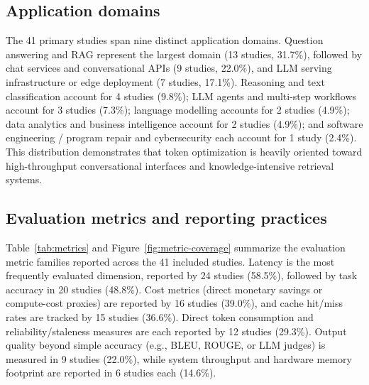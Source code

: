 \IfFileExists{jair.cls}{\documentclass{jair}}{\documentclass[manuscript,nonacm,screen]{acmart}}
\begin{document}
\subsection{Application domains}

The 41 primary studies span nine distinct application domains. Question answering and RAG represent the largest domain (13 studies, 31.7\%), followed by chat services and conversational APIs (9 studies, 22.0\%), and LLM serving infrastructure or edge deployment (7 studies, 17.1\%). Reasoning and text classification account for 4 studies (9.8\%); LLM agents and multi-step workflows account for 3 studies (7.3\%); language modelling accounts for 2 studies (4.9\%); data analytics and business intelligence account for 2 studies (4.9\%); and software engineering / program repair and cybersecurity each account for 1 study (2.4\%). This distribution demonstrates that token optimization is heavily oriented toward high-throughput conversational interfaces and knowledge-intensive retrieval systems.

\subsection{Evaluation metrics and reporting practices}

Table~\ref{tab:metrics} and Figure~\ref{fig:metric-coverage} summarize the evaluation metric families reported across the 41 included studies. Latency is the most frequently evaluated dimension, reported by 24 studies (58.5\%), followed by task accuracy in 20 studies (48.8\%). Cost metrics (direct monetary savings or compute-cost proxies) are reported by 16 studies (39.0\%), and cache hit/miss rates are tracked by 15 studies (36.6\%). Direct token consumption and reliability/staleness measures are each reported by 12 studies (29.3\%). Output quality beyond simple accuracy (e.g., BLEU, ROUGE, or LLM judges) is measured in 9 studies (22.0\%), while system throughput and hardware memory footprint are reported in 6 studies each (14.6\%).
\end{document}
